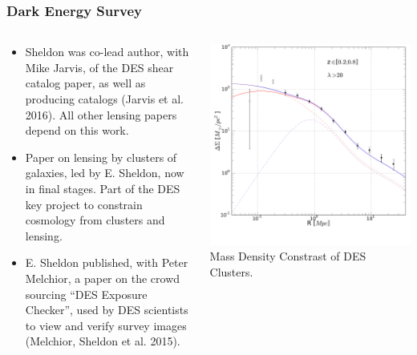 \documentclass{beamer}
\begin{document}
\frame
{

    \frametitle{Dark Energy Survey}

    \fontsize{9}{0.8\baselineskip}

    \begin{columns}

        \begin{column}{0.5\textwidth}

            \begin{itemize}

                \item Sheldon was co-lead author, with Mike Jarvis, of the DES shear catalog
                    paper, as well as producing catalogs (Jarvis et al. 2016).  All
                    other lensing papers depend on this work.


                \item Paper on lensing by clusters of galaxies, led by E. Sheldon,
                    now in final stages.  Part of the DES key project to constrain
                    cosmology from clusters and lensing.

                \item E. Sheldon published, with Peter Melchior, a paper on the crowd
                    sourcing ``DES Exposure Checker'', used by DES scientists
                    to view and verify survey images (Melchior, Sheldon et al. 2015).

            \end{itemize}

        \end{column}

        \begin{column}{0.5\textwidth}
            \includegraphics[scale=0.17]{delta_sigma_best_fit_z9_l9.pdf}
            \newline
            {\tiny Mass Density Constrast of DES Clusters.}
        \end{column}


\end{columns}}
\end{document}
